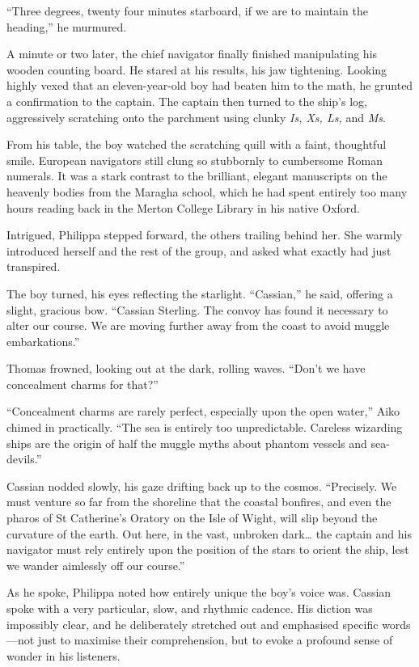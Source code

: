 \enquote{Three degrees, twenty four minutes starboard, if we are to maintain the heading,} he murmured.

A minute or two later, the chief navigator finally finished manipulating his wooden counting board. He stared at his results, his jaw tightening. Looking highly vexed that an eleven-year-old boy had beaten him to the math, he grunted a confirmation to the captain. The captain then turned to the ship's log, aggressively scratching onto the parchment using clunky \textit{Is, Xs, Ls,} and \textit{Ms}.

From his table, the boy watched the scratching quill with a faint, thoughtful smile. European navigators still clung so stubbornly to cumbersome Roman numerals. It was a stark contrast to the brilliant, elegant manuscripts on the heavenly bodies from the Maragha school, which he had spent entirely too many hours reading back in the Merton College Library in his native Oxford.

Intrigued, Philippa stepped forward, the others trailing behind her. She warmly introduced herself and the rest of the group, and asked what exactly had just transpired.

The boy turned, his eyes reflecting the starlight. \enquote{Cassian,} he said, offering a slight, gracious bow. \enquote{Cassian Sterling. The convoy has found it necessary to alter our course. We are moving further away from the coast to avoid muggle embarkations.}

Thomas frowned, looking out at the dark, rolling waves. \enquote{Don't we have concealment charms for that?}

\enquote{Concealment charms are rarely perfect, especially upon the open water,} Aiko chimed in practically. \enquote{The sea is entirely too unpredictable. Careless wizarding ships are the origin of half the muggle myths about phantom vessels and sea-devils.}

Cassian nodded slowly, his gaze drifting back up to the cosmos. \enquote{Precisely. We must venture so far from the shoreline that the coastal bonfires, and even the pharos of St Catherine's Oratory on the Isle of Wight, will slip beyond the curvature of the earth. Out here, in the vast, unbroken dark\ldots{} the captain and his navigator must rely entirely upon the position of the stars to orient the ship, lest we wander aimlessly off our course.}

As he spoke, Philippa noted how entirely unique the boy's voice was. Cassian spoke with a very particular, slow, and rhythmic cadence. His diction was impossibly clear, and he deliberately stretched out and emphasised specific words---not just to maximise their comprehension, but to evoke a profound sense of wonder in his listeners.

